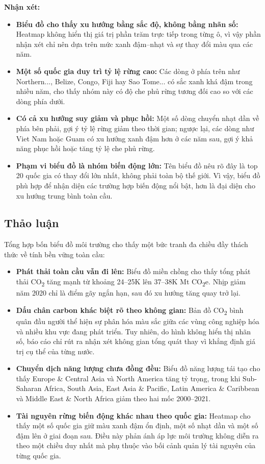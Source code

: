 \textbf{Nhận xét:}
\begin{itemize}
    \item \textbf{Biểu đồ cho thấy xu hướng bằng sắc độ, không bằng nhãn số:} Heatmap không hiển thị giá trị phần trăm trực tiếp trong từng ô, vì vậy phần nhận xét chỉ nên dựa trên mức xanh đậm--nhạt và sự thay đổi màu qua các năm.
    \item \textbf{Một số quốc gia duy trì tỷ lệ rừng cao:} Các dòng ở phía trên như Northern..., Belize, Congo, Fiji hay Sao Tome... có sắc xanh khá đậm trong nhiều năm, cho thấy nhóm này có độ che phủ rừng tương đối cao so với các dòng phía dưới.
    \item \textbf{Có cả xu hướng suy giảm và phục hồi:} Một số dòng chuyển nhạt dần về phía bên phải, gợi ý tỷ lệ rừng giảm theo thời gian; ngược lại, các dòng như Viet Nam hoặc Guam có xu hướng xanh đậm hơn ở các năm sau, gợi ý khả năng phục hồi hoặc tăng tỷ lệ che phủ rừng.
    \item \textbf{Phạm vi biểu đồ là nhóm biến động lớn:} Tên biểu đồ nêu rõ đây là top 20 quốc gia có thay đổi lớn nhất, không phải toàn bộ thế giới. Vì vậy, biểu đồ phù hợp để nhận diện các trường hợp biến động nổi bật, hơn là đại diện cho xu hướng trung bình toàn cầu.
\end{itemize}

\subsection{Thảo luận}

Tổng hợp bốn biểu đồ môi trường cho thấy một bức tranh đa chiều đầy thách thức về tính bền vững toàn cầu:
\begin{itemize}
    \item \textbf{Phát thải toàn cầu vẫn đi lên:} Biểu đồ miền chồng cho thấy tổng phát thải CO\textsubscript{2} tăng mạnh từ khoảng 24--25K lên 37--38K Mt CO\textsubscript{2}e. Nhịp giảm năm 2020 chỉ là điểm gãy ngắn hạn, sau đó xu hướng tăng quay trở lại.
    \item \textbf{Dấu chân carbon khác biệt rõ theo không gian:} Bản đồ CO\textsubscript{2} bình quân đầu người thể hiện sự phân hóa màu sắc giữa các vùng công nghiệp hóa và nhiều khu vực đang phát triển. Tuy nhiên, do hình không hiển thị nhãn số, báo cáo chỉ rút ra nhận xét không gian tổng quát thay vì khẳng định giá trị cụ thể của từng nước.
    \item \textbf{Chuyển dịch năng lượng chưa đồng đều:} Biểu đồ năng lượng tái tạo cho thấy Europe \& Central Asia và North America tăng tỷ trọng, trong khi Sub-Saharan Africa, South Asia, East Asia \& Pacific, Latin America \& Caribbean và Middle East \& North Africa giảm theo hai mốc 2000--2021.
    \item \textbf{Tài nguyên rừng biến động khác nhau theo quốc gia:} Heatmap cho thấy một số quốc gia giữ màu xanh đậm ổn định, một số nhạt dần và một số đậm lên ở giai đoạn sau. Điều này phản ánh áp lực môi trường không diễn ra theo một chiều duy nhất mà phụ thuộc vào bối cảnh quản lý tài nguyên của từng quốc gia.
\end{itemize}

